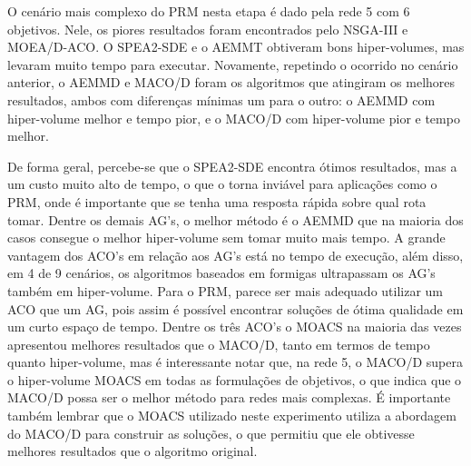 O cenário mais complexo do PRM nesta etapa é dado pela rede 5 com 6 objetivos. Nele, os piores resultados foram encontrados pelo NSGA-III e MOEA/D-ACO. O SPEA2-SDE e o AEMMT obtiveram bons hiper-volumes, mas levaram muito tempo para executar. Novamente, repetindo o ocorrido no cenário anterior, o AEMMD e MACO/D foram os algoritmos que atingiram os melhores resultados, ambos com diferenças mínimas um para o outro: o AEMMD com hiper-volume melhor e tempo pior, e o MACO/D com hiper-volume pior e tempo melhor.

De forma geral, percebe-se que o SPEA2-SDE encontra ótimos resultados, mas a um custo muito alto de tempo, o que o torna inviável para aplicações como o PRM, onde é importante que se tenha uma resposta rápida sobre qual rota tomar. Dentre os demais AG's, o melhor método é o AEMMD que na maioria dos casos consegue o melhor hiper-volume sem tomar muito mais tempo. A grande vantagem dos ACO's em relação aos AG's está no tempo de execução, além disso, em 4 de 9 cenários, os algoritmos baseados em formigas ultrapassam os AG's também em hiper-volume. Para o PRM, parece ser mais adequado utilizar um ACO que um AG, pois assim é possível encontrar soluções de ótima qualidade em um curto espaço de tempo. Dentre os três ACO's o MOACS na maioria das vezes apresentou melhores resultados que o MACO/D, tanto em termos de tempo quanto hiper-volume, mas é interessante notar que, na rede 5, o MACO/D supera o hiper-volume MOACS em todas as formulações de objetivos, o que indica que o MACO/D possa ser o melhor método para redes mais complexas. É importante também lembrar que o MOACS utilizado neste experimento utiliza a abordagem do MACO/D para construir as soluções, o que permitiu que ele obtivesse melhores resultados que o algoritmo original.